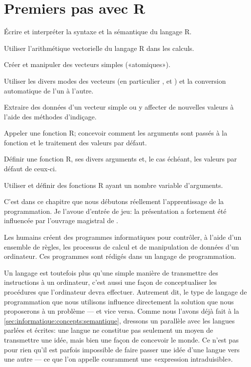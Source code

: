 
\chapter{Premiers pas avec R}
\label{chap:premiers}


\begin{objectifs}
\item Écrire et interpréter la syntaxe et la sémantique du langage R.
\item Utiliser l'arithmétique vectorielle du langage R dans les
  calculs.
\item Créer et manipuler des vecteurs simples («atomiques»).
\item Utiliser les divers modes des vecteurs (en particulier
  ,  et ) et la conversion
  automatique de l'un à l'autre.
\item Extraire des données d'un vecteur simple ou y affecter de
  nouvelles valeurs à l'aide des méthodes d'indiçage.
\item Appeler une fonction R; concevoir comment les arguments sont
  passés à la fonction et le traitement des valeurs par défaut.
\item Définir une fonction R, ses divers arguments et, le cas échéant,
  les valeurs par défaut de ceux-ci.
\item Utiliser et définir des fonctions R ayant un nombre variable
  d'arguments.
\end{objectifs}

C'est dans ce chapitre que nous débutons réellement l'apprentissage de
la programmation. Je l'avoue d'entrée de jeu: la présentation a
fortement été influencée par l'ouvrage magistral de
\cite{Sussman:scheme:1996}.

Les humains créent des programmes informatiques pour contrôler, à
l'aide d'un ensemble de règles, les processus de calcul et de
manipulation de données d'un ordinateur. Ces programmes sont rédigés
dans un langage de programmation.

Un langage est toutefois plus qu'une simple manière de transmettre des
instructions à un ordinateur, c'est aussi une façon de conceptualiser
les procédures que l'ordinateur devra effectuer. Autrement dit, le
type de langage de programmation que nous utilisons influence
directement la solution que nous proposerons à un problème --- et vice
versa. Comme nous l'avons déjà fait à la
\autoref{sec:informatique:concepts:semantique}, dressons un parallèle
avec les langues parlées et écrites: une langue ne constitue pas
seulement un moyen de transmettre une idée, mais bien une façon de
concevoir le monde. Ce n'est pas pour rien qu'il est parfois
impossible de faire passer une idée d'une langue vers une autre --- ce
que l'on appelle couramment une «expression intraduisible».

